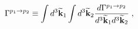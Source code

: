 \begin{equation}
\Gamma^{p_1 \to p_2} 
\equiv 
\int d^3 \widetilde{\bf k}_1
\int d^3 \widetilde{\bf k}_2
\frac{d\Gamma^{p_1 \to p_2}}{d^3 \widetilde{\bf k}_1 d^3 \widetilde{\bf k}_2}\;,
\label{Gaux}
\end{equation}

